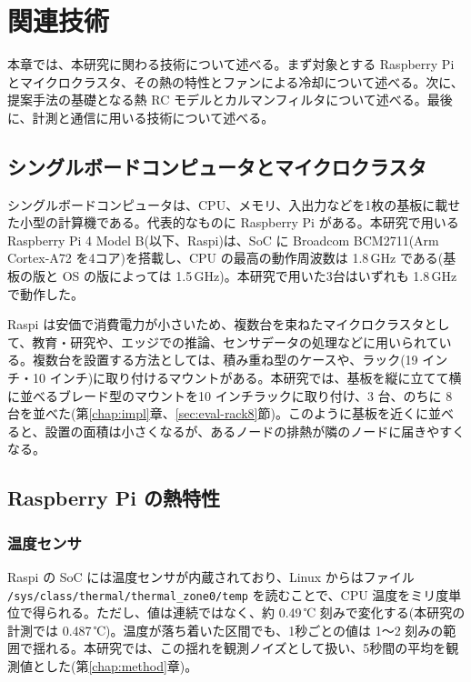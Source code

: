 \chapter{関連技術}\label{chap:background}

本章では、本研究に関わる技術について述べる。まず対象とする Raspberry Pi とマイクロクラスタ、その熱の特性とファンによる冷却について述べる。次に、提案手法の基礎となる熱 RC モデルとカルマンフィルタについて述べる。最後に、計測と通信に用いる技術について述べる。

\section{シングルボードコンピュータとマイクロクラスタ}\label{sec:bg-sbc}
シングルボードコンピュータは、CPU、メモリ、入出力などを1枚の基板に載せた小型の計算機である。代表的なものに Raspberry Pi がある。本研究で用いる Raspberry Pi 4 Model B(以下、Raspi)は、SoC に Broadcom BCM2711(Arm Cortex-A72 を4コア)を搭載し、CPU の最高の動作周波数は 1.8\,GHz である(基板の版と OS の版によっては 1.5\,GHz)\cite{rpi2026cooling}。本研究で用いた3台はいずれも 1.8\,GHz で動作した。

Raspi は安価で消費電力が小さいため、複数台を束ねたマイクロクラスタとして、教育・研究や、エッジでの推論、センサデータの処理などに用いられている\cite{iridispi2014}。複数台を設置する方法としては、積み重ね型のケースや、ラック(19 インチ・10 インチ)に取り付けるマウントがある。本研究では、基板を縦に立てて横に並べるブレード型のマウントを10 インチラックに取り付け、3 台、のちに 8 台を並べた(第\ref{chap:impl}章、\ref{sec:eval-rack8}節)。このように基板を近くに並べると、設置の面積は小さくなるが、あるノードの排熱が隣のノードに届きやすくなる。

\section{Raspberry Pi の熱特性}\label{sec:bg-thermal}
\subsection{温度センサ}
Raspi の SoC には温度センサが内蔵されており、Linux からはファイル \texttt{/sys/class/thermal/\allowbreak thermal\_zone0/\allowbreak temp} を読むことで、CPU 温度をミリ度単位で得られる。ただし、値は連続ではなく、約 0.49\,℃ 刻みで変化する(本研究の計測では 0.487\,℃)。温度が落ち着いた区間でも、1秒ごとの値は 1〜2 刻みの範囲で揺れる。本研究では、この揺れを観測ノイズとして扱い、5秒間の平均を観測値とした(第\ref{chap:method}章)。

